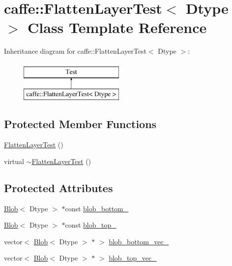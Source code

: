 \hypertarget{classcaffe_1_1_flatten_layer_test}{\section{caffe\+:\+:Flatten\+Layer\+Test$<$ Dtype $>$ Class Template Reference}
\label{classcaffe_1_1_flatten_layer_test}
}
Inheritance diagram for caffe\+:\+:Flatten\+Layer\+Test$<$ Dtype $>$\+:\begin{figure}[H]
\begin{center}
\leavevmode
\includegraphics[height=2.000000cm]{classcaffe_1_1_flatten_layer_test}
\end{center}
\end{figure}
\subsection*{Protected Member Functions}
\begin{DoxyCompactItemize}
\item 
\hyperlink{classcaffe_1_1_flatten_layer_test_a58a9ad57ec7a4b131b713dd126a90198}{Flatten\+Layer\+Test} ()
\item 
virtual \hyperlink{classcaffe_1_1_flatten_layer_test_af3be11d061c8cf0d5e5f83c0aa0b7845}{$\sim$\+Flatten\+Layer\+Test} ()
\end{DoxyCompactItemize}
\subsection*{Protected Attributes}
\begin{DoxyCompactItemize}
\item 
\hyperlink{classcaffe_1_1_blob}{Blob}$<$ Dtype $>$ $\ast$const \hyperlink{classcaffe_1_1_flatten_layer_test_ac553bdfc0fcbf8c9e2c5f46f81a8bdca}{blob\+\_\+bottom\+\_\+}
\item 
\hyperlink{classcaffe_1_1_blob}{Blob}$<$ Dtype $>$ $\ast$const \hyperlink{classcaffe_1_1_flatten_layer_test_ab9f5b6129a7e55a87a5fea1f42deb1b4}{blob\+\_\+top\+\_\+}
\item 
vector$<$ \hyperlink{classcaffe_1_1_blob}{Blob}$<$ Dtype $>$ $\ast$ $>$ \hyperlink{classcaffe_1_1_flatten_layer_test_a65edcf7c3a3a0dc8cb5058dc2514a7fb}{blob\+\_\+bottom\+\_\+vec\+\_\+}
\item 
vector$<$ \hyperlink{classcaffe_1_1_blob}{Blob}$<$ Dtype $>$ $\ast$ $>$ \hyperlink{classcaffe_1_1_flatten_layer_test_aacf4562ee42d8d7a3336b0f5f7e1cfc1}{blob\+\_\+top\+\_\+vec\+\_\+}
\end{DoxyCompactItemize}


